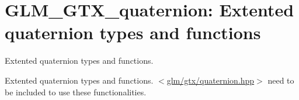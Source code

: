 \hypertarget{group__gtx__quaternion}{\section{\-G\-L\-M\-\_\-\-G\-T\-X\-\_\-quaternion\-: \-Extented quaternion types and functions}
\label{group__gtx__quaternion}
}


\-Extented quaternion types and functions.  


\-Extented quaternion types and functions. $<$\hyperlink{gtx_2quaternion_8hpp}{glm/gtx/quaternion.\-hpp}$>$ need to be included to use these functionalities. 